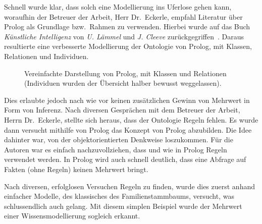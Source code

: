 Schnell wurde klar, dass solch eine Modellierung ins Uferlose gehen kann, woraufhin der Betreuer der Arbeit, Herr Dr.\ Eckerle, empfahl Literatur über Prolog als Grundlage bzw.\ Rahmen zu verwenden. Hierbei wurde auf das Buch \textit{Künstliche Intelligenz} von \textit{U. Lämmel} und \textit{J. Cleeve} zurückgegriffen~\cite{laemmel}. Daraus resultierte eine verbesserte Modellierung der Ontologie von Prolog, mit Klassen, Relationen und Individuen.

\begin{figure}[H]
\centering {}
\caption{Vereinfachte Darstellung von Prolog, mit Klassen und Relationen (Individuen wurden der Übersicht halber bewusst weggelassen).\label{fig:prolog_baum}\protect\footnotemark}
\end{figure}

Dies erlaubte jedoch nach wie vor keinen zusätzlichen Gewinn von Mehrwert in Form von Inferenz. Nach diversen Gesprächen mit dem Betreuer der Arbeit, Herrn Dr.\ Eckerle, stellte sich heraus, dass der Ontologie Regeln fehlen. Es wurde dann versucht mithilfe von Prolog das Konzept von Prolog abzubilden. Die Idee dahinter war, von der objektorientierten Denkweise loszukommen. Für die Autoren war es einfach nachzuvollziehen, dass und wie in Prolog Regeln verwendet werden. In Prolog wird auch schnell deutlich, dass eine Abfrage auf Fakten (ohne Regeln) keinen Mehrwert bringt.


Nach diversen, erfolglosen Versuchen Regeln zu finden, wurde dies zuerst anhand einfacher Modelle, des klassisches des Familienstammbaums, versucht, was schlussendlich auch gelang. Mit diesem simplen Beispiel wurde der Mehrwert einer Wissensmodellierung sogleich erkannt.

